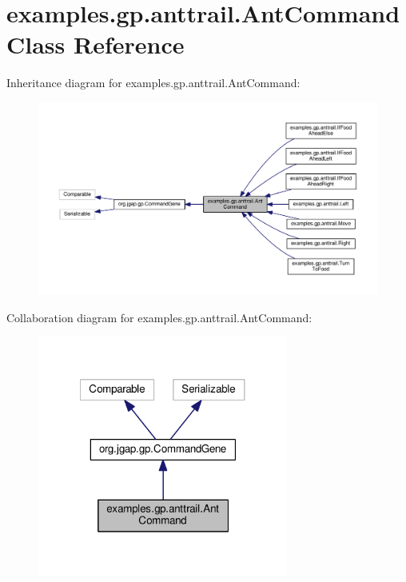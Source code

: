 \hypertarget{classexamples_1_1gp_1_1anttrail_1_1_ant_command}{\section{examples.\-gp.\-anttrail.\-Ant\-Command Class Reference}
\label{classexamples_1_1gp_1_1anttrail_1_1_ant_command}
}


Inheritance diagram for examples.\-gp.\-anttrail.\-Ant\-Command\-:
\nopagebreak
\begin{figure}[H]
\begin{center}
\leavevmode
\includegraphics[width=350pt]{classexamples_1_1gp_1_1anttrail_1_1_ant_command__inherit__graph}
\end{center}
\end{figure}


Collaboration diagram for examples.\-gp.\-anttrail.\-Ant\-Command\-:
\nopagebreak
\begin{figure}[H]
\begin{center}
\leavevmode
\includegraphics[width=233pt]{classexamples_1_1gp_1_1anttrail_1_1_ant_command__coll__graph}
\end{center}
\end{figure}
